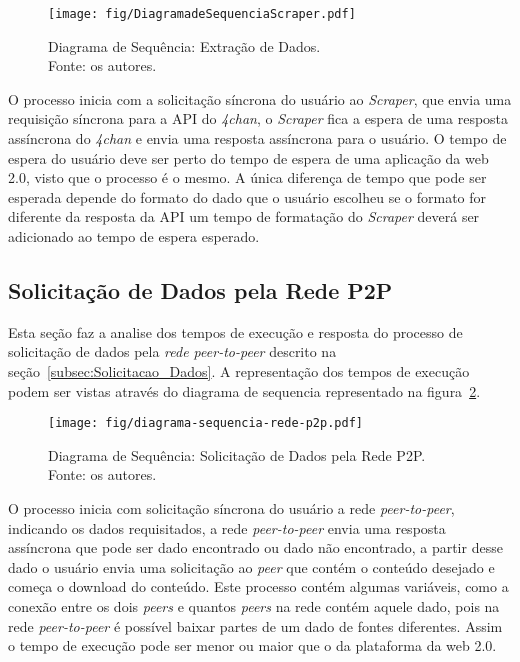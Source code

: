 \begin{figure}[htb]
    \texttt{[image: fig/DiagramadeSequenciaScraper.pdf]}
    \caption[Diagrama de Sequência: Extração de Dados]{
        Diagrama de Sequência: Extração de Dados.\\
        Fonte: os autores.
    }
    \label{fig:seq_extracao_dados}
\end{figure}

O processo inicia com a solicitação síncrona do usuário ao \textit{Scraper}, que envia uma requisição síncrona para a API do \textit{4chan}, o \textit{Scraper} fica a espera de uma resposta assíncrona do \textit{4chan} e envia uma resposta assíncrona para o usuário. 
O tempo de espera do usuário deve ser perto do tempo de espera de uma aplicação da web 2.0, visto que o processo é o mesmo. A única diferença de tempo que pode ser esperada depende do formato do dado que o usuário escolheu
se o formato for diferente da resposta da API um tempo de formatação do \textit{Scraper} deverá ser adicionado ao tempo de espera esperado.

\subsection{Solicitação de Dados pela Rede P2P}
Esta seção faz a analise dos tempos de execução e resposta do processo de solicitação de dados pela \textit{rede peer-to-peer} descrito na seção~\ref{subsec:Solicitacao_Dados}. A representação dos tempos de execução podem ser vistas através do diagrama de sequencia representado na figura~\ref{fig:seq_Solicitacao_dados}. 

\begin{figure}[H]
    \texttt{[image: fig/diagrama-sequencia-rede-p2p.pdf]}
    \caption[Sequence diagram: requesting data to peers]{
        Diagrama de Sequência: Solicitação de Dados pela Rede P2P.\\
        Fonte: os autores.
    }
    \label{fig:seq_Solicitacao_dados}
\end{figure}

O processo inicia com solicitação síncrona do usuário a rede \textit{peer-to-peer}, indicando os dados
requisitados, a rede \textit{peer-to-peer} envia uma resposta assíncrona que pode ser dado encontrado ou dado não encontrado,
a partir desse dado o usuário envia uma solicitação ao \textit{peer} que contém o conteúdo desejado
e começa o download do conteúdo. Este processo contém algumas variáveis, como a conexão entre os dois \textit{peers}
e quantos \textit{peers} na rede contém aquele dado, pois na rede \textit{peer-to-peer} é possível baixar partes de um dado de fontes diferentes. Assim o tempo de execução pode ser menor ou maior que o da plataforma da web 2.0.
